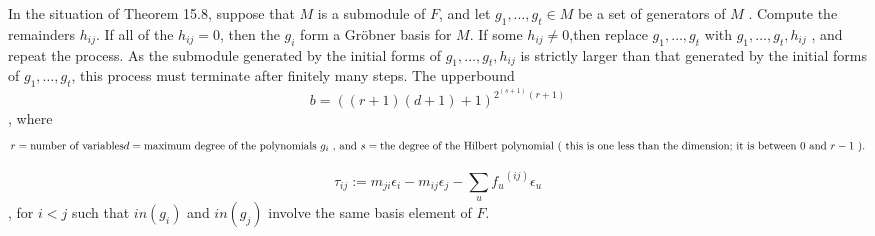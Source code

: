 \documentclass{article}
\begin{document}
\begin{algo}
	In the situation of Theorem 15.8, suppose that \( M \) is a submodule of \( F \), and let
	\( g_1,\dots,g_t \in M \)
	be a set of generators of \( M \) .
	Compute the remainders \( h_{ij} \).
	If all of the \( h_{ij}=0 \), then the \( g_i \) form a Gr\"obner basis for \( M \).
	If some \( h_{ij} \neq 0\),then replace 
	\( g_1, \dots,g_t \)
	with 
	\( g_1, \dots,g_t,h_{ij} \)
	, and repeat the process.
	As the submodule generated by the initial forms of
	\(g_1,\dots,g_t,h_{ij} \)
	is strictly larger than that generated by the initial forms of
	\( g_1, \dots,g_t \),
	this process must terminate after finitely many steps.
	The upperbound \[
		b=\left( \left( r+1 \right)\left( d+1 \right)+1 \right)^{2^{(s+1)}(r+1) }
	\],
	where 
	\[
		r = \text{number of variables} \\
		d = \text{maximum degree of the polynomials \( g_i\) , and } \\
		s = \text{the degree of the Hilbert polynomial ( this is one less than the dimension; it is between \( 0 \) and \(r-1\) ).}
	\]
\end{algo}
\begin{defn}[\nocite{Eis1}{334}]
	\[
		\tau_{ij}:=m_{ji}\epsilon_{i} - m_{ij} \epsilon_{j} - \sum_{u} {f_{u}}^{\left( ij \right) } \epsilon_{u} 
	\],
	for \( i < j \) such that \( in \left( g_{i}  \right) \) and \( in \left( g_{j}  \right) \)
	involve the same basis element of \( F \).
\end{defn}
\end{document}
